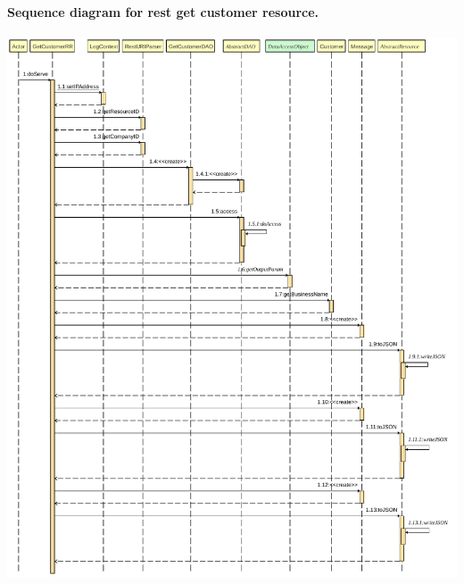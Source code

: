 \paragraph[]{Sequence diagram for rest get customer resource.} \hspace{1mm} \par
\includegraphics[width=\textwidth, keepaspectratio]{resources/getcustomersequence.pdf}


